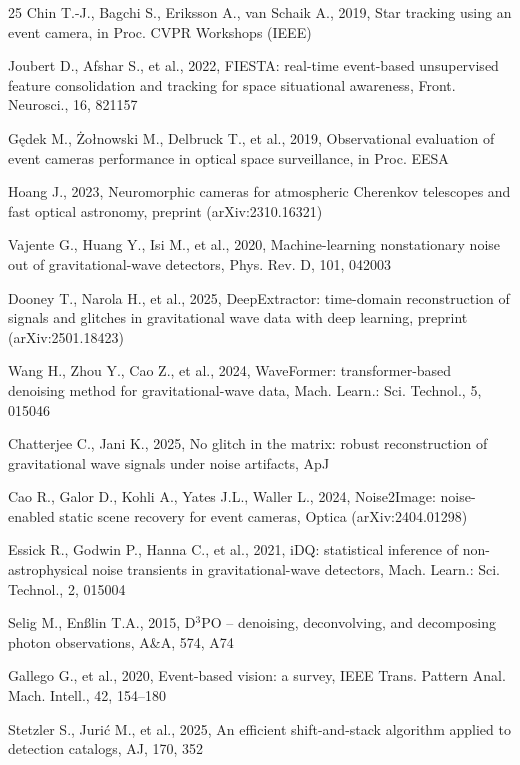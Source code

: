 \documentclass[twocolumn]{article}
\begin{document}
\begin{thebibliography}{25}
Chin T.-J., Bagchi S., Eriksson A., van Schaik A., 2019,
Star tracking using an event camera,
in Proc. CVPR Workshops (IEEE)

Joubert D., Afshar S., et al., 2022,
FIESTA: real-time event-based unsupervised feature consolidation and tracking for space situational awareness,
Front. Neurosci., 16, 821157

G\k{e}dek M., {\.Z}o{\l}nowski M., Delbruck T., et al., 2019,
Observational evaluation of event cameras performance in optical space surveillance,
in Proc. EESA

Hoang J., 2023,
Neuromorphic cameras for atmospheric Cherenkov telescopes and fast optical astronomy,
preprint (arXiv:2310.16321)

Vajente G., Huang Y., Isi M., et al., 2020,
Machine-learning nonstationary noise out of gravitational-wave detectors,
Phys. Rev. D, 101, 042003

Dooney T., Narola H., et al., 2025,
DeepExtractor: time-domain reconstruction of signals and glitches in gravitational wave data with deep learning,
preprint (arXiv:2501.18423)

Wang H., Zhou Y., Cao Z., et al., 2024,
WaveFormer: transformer-based denoising method for gravitational-wave data,
Mach. Learn.: Sci. Technol., 5, 015046

Chatterjee C., Jani K., 2025,
No glitch in the matrix: robust reconstruction of gravitational wave signals under noise artifacts,
ApJ

Cao R., Galor D., Kohli A., Yates J.L., Waller L., 2024,
Noise2Image: noise-enabled static scene recovery for event cameras,
Optica (arXiv:2404.01298)

Essick R., Godwin P., Hanna C., et al., 2021,
iDQ: statistical inference of non-astrophysical noise transients in gravitational-wave detectors,
Mach. Learn.: Sci. Technol., 2, 015004

Selig M., En{\ss}lin T.A., 2015,
D$^3$PO -- denoising, deconvolving, and decomposing photon observations,
A\&A, 574, A74

Gallego G., et al., 2020,
Event-based vision: a survey,
IEEE Trans. Pattern Anal. Mach. Intell., 42, 154--180

Stetzler S., Juri{\'c} M., et al., 2025,
An efficient shift-and-stack algorithm applied to detection catalogs,
AJ, 170, 352

\end{thebibliography}
\end{document}
